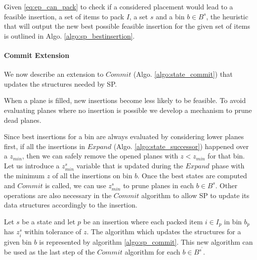 Given \cref{eq:ep_can_pack} to check if a considered placement would lead to a feasible insertion, a set of items to pack $I$, a set $s$ and a bin $b \in B^s$, the heuristic that will output the new best possible feasible insertion for the given set of items is outlined in Algo. \ref{algo:sp_bestinsertion}.




\paragraph*{Commit Extension}
We now describe an extension to $Commit$ (Algo. \ref{algo:state_commit}) that updates the structures needed by SP.

When a plane is filled, new insertions become less likely to be feasible.
To avoid evaluating planes where no insertion is possible we develop a mechanism to prune dead planes.

Since best insertions for a bin are always evaluated by considering lower planes first, if all the insertions in $Expand$ (Algo. \ref{algo:state_successor}) happened over a $z_{min}$, then we can safely remove the opened planes with $z < z_{min}$ for that bin.
Let us introduce a $z^s_{min}$ variable that is updated during the $Expand$ phase with the minimum $z$ of all the insertions on bin $b$.
Once the best states are computed and $Commit$ is called, we can use $z^s_{min}$ to prune planes in each $b \in B^s$.
Other operations are also necessary in the $Commit$ algorithm to allow SP to update its data structures accordingly to the insertion.

Let $s$ be a state and let $p$ be an insertion where each packed item $i \in I_p$ in bin $b_p$ has $z^s_i$ within tolerance of $z$.
The algorithm which updates the structures for a given bin $b$ is represented by algorithm \ref{algo:sp_commit}.
This new algorithm can be used as the last step of the $Commit$ algorithm for each $b \in B^{s^\prime}$.




